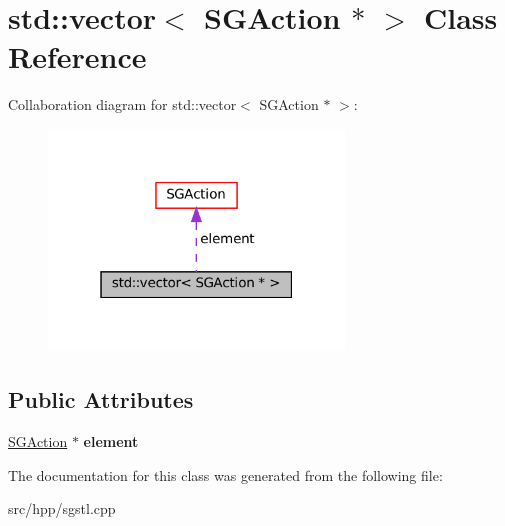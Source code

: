 \hypertarget{classstd_1_1vector_3_01SGAction_01_5_01_4}{}\section{std\+:\+:vector$<$ S\+G\+Action $\ast$ $>$ Class Reference}
\label{classstd_1_1vector_3_01SGAction_01_5_01_4}


Collaboration diagram for std\+:\+:vector$<$ S\+G\+Action $\ast$ $>$\+:
\nopagebreak
\begin{figure}[H]
\begin{center}
\leavevmode
\includegraphics[width=223pt]{classstd_1_1vector_3_01SGAction_01_5_01_4__coll__graph}
\end{center}
\end{figure}
\subsection*{Public Attributes}
\begin{DoxyCompactItemize}
\item 
\mbox{\label{classstd_1_1vector_3_01SGAction_01_5_01_4_a6fb5e19318de6e534f72929c35db3658}} 
\hyperlink{classSGAction}{S\+G\+Action} $\ast$ {\bfseries element}
\end{DoxyCompactItemize}


The documentation for this class was generated from the following file\+:\begin{DoxyCompactItemize}
\item 
src/hpp/sgstl.\+cpp\end{DoxyCompactItemize}

